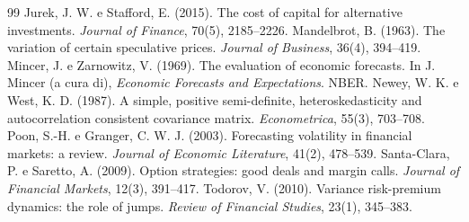 \documentclass[11pt,a4paper]{article}
\begin{document}
\begin{thebibliography}{99}
\bibitem{} Jurek, J. W. e Stafford, E. (2015). The cost of capital for alternative investments. \emph{Journal of Finance}, 70(5), 2185--2226.
\bibitem{} Mandelbrot, B. (1963). The variation of certain speculative prices. \emph{Journal of Business}, 36(4), 394--419.
\bibitem{} Mincer, J. e Zarnowitz, V. (1969). The evaluation of economic forecasts. In J. Mincer (a cura di), \emph{Economic Forecasts and Expectations}. NBER.
\bibitem{} Newey, W. K. e West, K. D. (1987). A simple, positive semi-definite, heteroskedasticity and autocorrelation consistent covariance matrix. \emph{Econometrica}, 55(3), 703--708.
\bibitem{} Poon, S.-H. e Granger, C. W. J. (2003). Forecasting volatility in financial markets: a review. \emph{Journal of Economic Literature}, 41(2), 478--539.
\bibitem{} Santa-Clara, P. e Saretto, A. (2009). Option strategies: good deals and margin calls. \emph{Journal of Financial Markets}, 12(3), 391--417.
\bibitem{} Todorov, V. (2010). Variance risk-premium dynamics: the role of jumps. \emph{Review of Financial Studies}, 23(1), 345--383.
\end{thebibliography}
\end{document}
